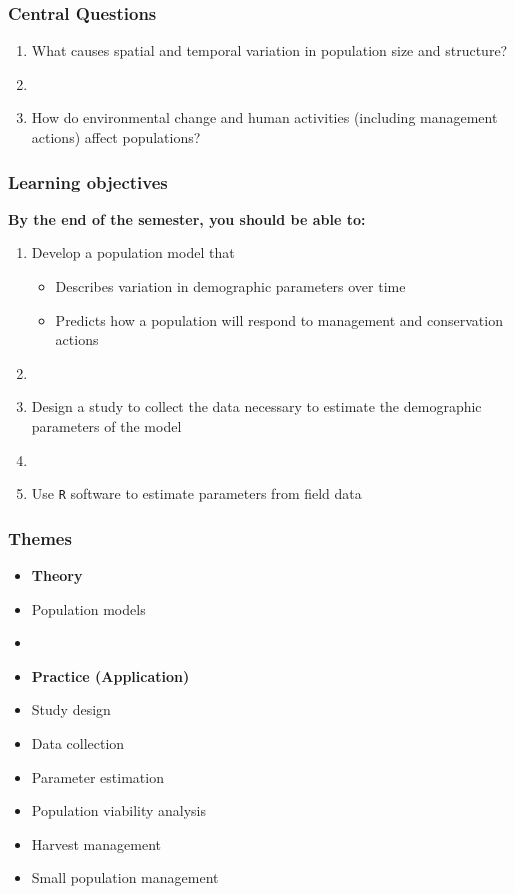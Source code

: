 \documentclass[color=usenames,dvipsnames]{beamer}
\begin{document}
\begin{frame}
\frametitle{Central Questions}
  \large \centering
  \begin{enumerate}[\bf 1.]
    \item What causes spatial and temporal variation in population size
    and structure? \par
    \item[]
    \item<2-> How do environmental change and human activities (including
      management actions) affect populations?
  \end{enumerate}
\end{frame}



\begin{frame}
  \frametitle{Learning objectives}
  \large
  {\bf By the end of the semester, you should be able to: \\}
  \vspace{0.3cm}
  \begin{enumerate}[\bf 1.]
    \large
    \item<1-> Develop a population model that
      \begin{itemize}
        \normalsize %
        \item Describes variation in demographic parameters over time
        \item Predicts how a population will respond to
          management and conservation actions
      \end{itemize}
    \item[]
    \item<2-> Design a study to collect the data necessary to estimate
      the demographic parameters of the model
    \item[]
    \item<3-> Use {\tt R} software to estimate parameters from field data
  \end{enumerate}
\end{frame}



\begin{frame}
  \frametitle{Themes}
  \large
  \begin{itemize}
    \item[] {\hspace{-0.9cm} \bf Theory}
    \item Population models
    \item[]
    \item[] {\hspace{-0.9cm} \bf Practice (Application)}
    \item Study design
    \item Data collection
    \item Parameter estimation
    \item Population viability analysis
    \item Harvest management
    \item Small population management
  \end{itemize}
\end{frame}
\end{document}
